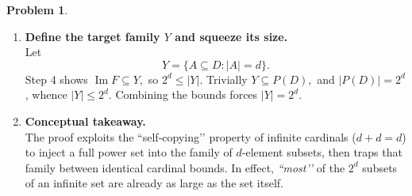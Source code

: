 \documentclass[12pt]{article}
\theoremstyle{definition} %
\newtheorem{problem}{Problem}
\theoremstyle{plain} %
\begin{document}
\begin{problem}
\begin{enumerate}
        \item \textbf{Define the target family $Y$ and squeeze its size.}\\
              Let
              \[
                  Y=\{A\subseteq D : |A|=d\}.
              \]
              Step 4 shows
              \(
                  \operatorname{Im}F\subseteq Y,
              \)
              so
              \(
                  2^{d}\le |Y|.
              \)
              Trivially
              \(
                  Y\subseteq P(D),
              \)
              and $|P(D)|=2^{d}$, whence
              \(
                  |Y|\le 2^{d}.
              \)
              Combining the bounds forces
              \(
                  |Y|=2^{d}.
              \)

        \item \textbf{Conceptual takeaway.}\\
              The proof exploits the “self‑copying’’ property of infinite
              cardinals ($d+d=d$) to inject a full power set into the family
              of $d$‑element subsets, then traps that family between identical
              cardinal bounds.  In effect, \emph{“most’’} of the $2^{d}$
              subsets of an infinite set are already as large as the set
              itself.
              \qedhere
    \end{enumerate}
\end{problem}
\end{document}
